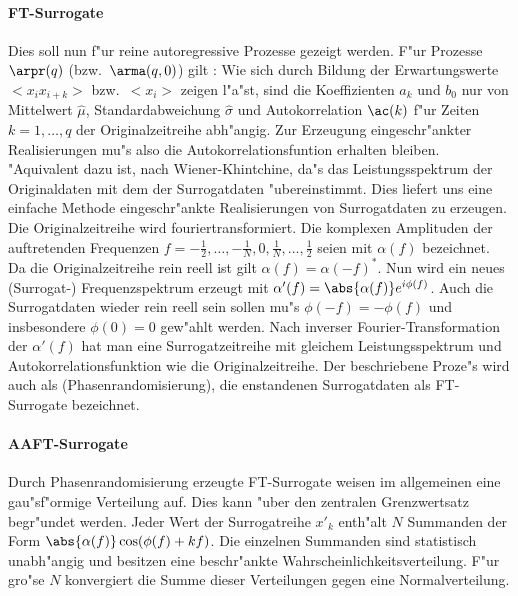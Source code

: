 \paragraph{FT-Surrogate}
Dies soll nun f"ur reine autoregressive Prozesse gezeigt werden\footnotemark. F"ur
Prozesse $\arpr(q)$ (bzw.\ $\arma(q,0)$) gilt :
Wie sich durch Bildung der Erwartungswerte $<x_ix_{i+k}>$ bzw.\  $<x_i>$ zeigen l"a"st,
sind die Koeffizienten $a_k$ und $b_0$ nur von Mittelwert $\hat\mu$, Standardabweichung 
$\hat\sigma$ und Autokorrelation $\ac(k)$ f"ur Zeiten $k=1,\dots,q$ der Originalzeitreihe abh"angig. Zur
Erzeugung eingeschr"ankter Realisierungen mu"s also die Autokorrelationsfuntion erhalten
bleiben. "Aquivalent dazu ist, nach Wiener-Khintchine, da"s das Leistungsspektrum der
Originaldaten mit dem der Surrogatdaten "ubereinstimmt. Dies liefert uns eine
einfache Methode eingeschr"ankte Realisierungen von Surrogatdaten zu erzeugen. Die
Originalzeitreihe wird fouriertransformiert.  Die komplexen Amplituden der auftretenden Frequenzen $f=-\frac12, \dots, -\frac1N, 0,
\frac1N, \dots, \frac12$ seien mit  $\alpha(f)$ bezeichnet. Da die Originalzeitreihe rein
reell ist gilt $\alpha(f)=\alpha(-f)^*$. Nun wird ein neues (Surrogat-) Frequenzspektrum
erzeugt mit $\alpha'(f)=\abs{\alpha(f)}e^{i\phi(f)}$. Auch die Surrogatdaten wieder rein
reell sein sollen mu"s $\phi(-f)=-\phi(f)$ und insbesondere $\phi(0)=0$ gew"ahlt
werden. Nach inverser Fourier-Transformation der $\alpha'(f)$ hat man eine
Surrogatzeitreihe mit gleichem Leistungsspektrum und Autokorrelationsfunktion wie die Originalzeitreihe.
Der beschriebene Proze"s wird auch als \begriff(Phasenrandomisierung), die enstandenen
Surrogatdaten als FT-Surrogate bezeichnet.


\paragraph{AAFT-Surrogate}
Durch Phasenrandomisierung erzeugte FT-Surrogate weisen im allgemeinen eine gau"sf"ormige
Verteilung auf. Dies kann "uber den zentralen Grenzwertsatz begr"undet werden. Jeder Wert
der Surrogatreihe $x'_k$ enth"alt $N$ Summanden der Form
$\abs{\alpha(f)}\cos(\phi(f)+kf)$. Die einzelnen Summanden sind statistisch unabh"angig
und besitzen eine beschr"ankte Wahrscheinlichkeitsverteilung. F"ur gro"se $N$ konvergiert
die Summe dieser Verteilungen gegen eine Normalverteilung. 

